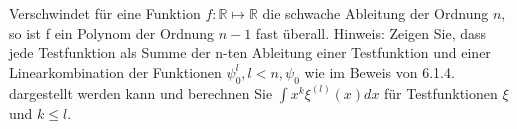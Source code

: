 Verschwindet für eine Funktion $f: \mathbb{R} \mapsto \mathbb{R}$ die schwache Ableitung der Ordnung $n$, so ist f ein Polynom der Ordnung $n-1$ fast überall.
Hinweis: Zeigen Sie, dass jede Testfunktion als Summe der n-ten Ableitung einer Testfunktion und einer Linearkombination der Funktionen $\psi_0^{l}, l < n, \psi_0$ wie
im Beweis von 6.1.4. dargestellt werden kann und berechnen Sie $\int x^k\xi^{(l)}(x)dx$ für Testfunktionen $\xi$ und $k \leq l$.
